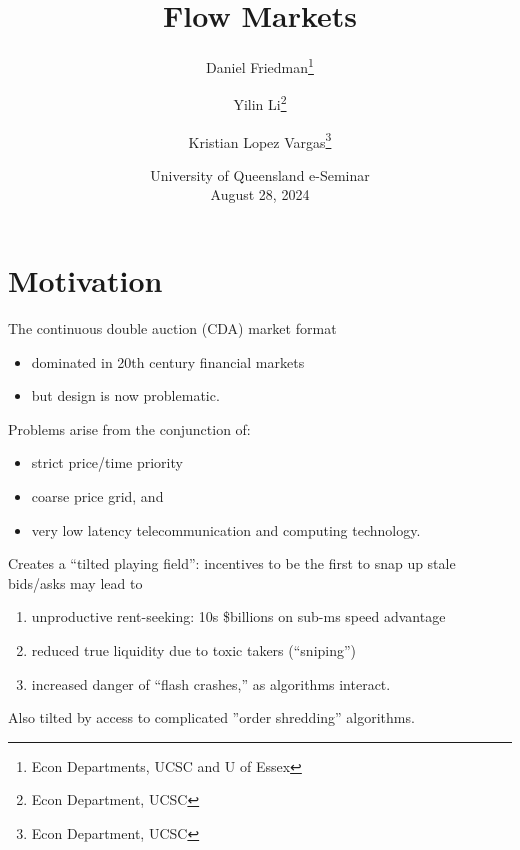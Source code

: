 \documentclass[10pt]{beamer}
\title[FlowMkts]{Flow Markets}
\author[DF]{Daniel Friedman\thanks{Econ Departments, UCSC and U of Essex}
\and Yilin Li\thanks{Econ Department, UCSC}
\and Kristian Lopez Vargas\thanks{Econ Department, UCSC}
}
\begin{document}
\date[UQ]{University of Queensland e-Seminar\\
August 28, 2024
} 

\frame{\titlepage} 






\section{Motivation}
\begin{frame}{
The continuous double auction (CDA) market format}
\begin{itemize}
\item dominated in 20th century financial markets 
\item but design is now problematic.  \pause
\end{itemize}
Problems arise from the conjunction of:
\begin{itemize}
\item strict price/time priority  
\item coarse price grid, and 
\item very low latency telecommunication and computing technology.

 \end{itemize} 
 \end{frame}

\begin{frame}{Creates a ``tilted playing field'': }
incentives to be the first to snap up stale bids/asks may lead to
 \pause
\begin{enumerate}
\item unproductive rent-seeking: 10s \$billions on sub-ms speed advantage \pause
\item reduced true liquidity due to toxic takers (``sniping'') \pause
\item increased danger of ``flash crashes,'' as algorithms interact. \pause
  \end{enumerate}
Also tilted by access to complicated ''order shredding'' algorithms.
\end{frame}
\end{document}
